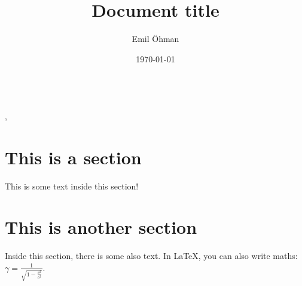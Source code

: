 \documentclass[a4paper]{article}
\title{Document title}
\author{Emil Öhman}
\date{\today}
\begin{document}
\thispagestyle{plain} %

\makeatletter
\noindent\huge{\textbf{\@title}}\vspace{0.33em}\\
\Large{\@author, \@date}\normalsize
\makeatother

\tableofcontents

\section{This is a section}
This is some text inside this section!

\section{This is another section}
Inside this section, there is some also text. In \LaTeX, you can also write maths: \(\gamma=\frac{1}{\sqrt{1-{\frac{v^2}{c^2}}}}\).
\end{document}
